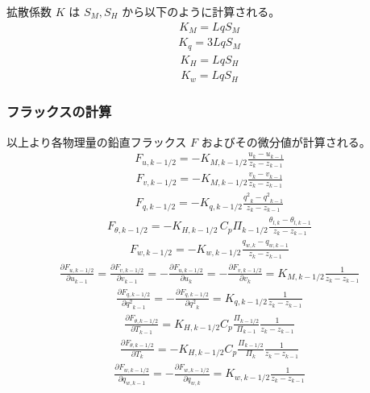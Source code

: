拡散係数 \(K\) は \(S_M,S_H\) から以下のように計算される。 \begin{eqnarray}K_M=LqS_M\end{eqnarray}
\begin{eqnarray}K_q=3LqS_M\end{eqnarray} \begin{eqnarray}K_H=LqS_H\end{eqnarray} \begin{eqnarray}K_w=LqS_H\end{eqnarray}

\hypertarget{ux30d5ux30e9ux30c3ux30afux30b9ux306eux8a08ux7b97}{%
\subsubsection{フラックスの計算}\label{ux30d5ux30e9ux30c3ux30afux30b9ux306eux8a08ux7b97}}

以上より各物理量の鉛直フラックス \(F\) およびその微分値が計算される。
\begin{eqnarray}F_{u,k-1/2}=-K_{M,k-1/2}\frac{u_{k}-u_{k-1}}{z_k-z_{k-1}}\end{eqnarray}
\begin{eqnarray}F_{v,k-1/2}=-K_{M,k-1/2}\frac{v_{k}-v_{k-1}}{z_k-z_{k-1}}\end{eqnarray}
\begin{eqnarray}F_{q,k-1/2}=-K_{q,k-1/2}\frac{{q^2}_ {k}-{q^2}_ {k-1}}{z_k-z_{k-1}}\end{eqnarray}
\begin{eqnarray}F_{\theta,k-1/2}=-K_{H,k-1/2}\,C_p\Pi_{k-1/2}\frac{\theta_{l,k}-\theta_{l,k-1}}{z_k-z_{k-1}}\end{eqnarray}
\begin{eqnarray}F_{w,k-1/2}=-K_{w,k-1/2}\frac{q_{w,k}-q_{w,k-1}}{z_k-z_{k-1}}\end{eqnarray}
\begin{eqnarray}\frac{\partial F_{u,k-1/2}}{\partial u_{k-1}}=\frac{\partial F_{v,k-1/2}}{\partial v_{k-1}}=-\frac{\partial F_{u,k-1/2}}{\partial u_{k}}=-\frac{\partial F_{v,k-1/2}}{\partial v_{k}}=K_{M,k-1/2}\frac{1}{z_k-z_{k-1}}\end{eqnarray}
\begin{eqnarray}\frac{\partial F_{q,k-1/2}}{\partial {q^2}_ {k-1}}=-\frac{\partial F_{q,k-1/2}}{\partial {q^2}_ {k}}=K_{q,k-1/2}\frac{1}{z_k-z_{k-1}}\end{eqnarray}
\begin{eqnarray}\frac{\partial F_{\theta,k-1/2}}{\partial T_{k-1}}=K_{H,k-1/2}C_p\frac{\Pi_{k-1/2}}{\Pi_{k-1}}\frac{1}{z_k-z_{k-1}}\end{eqnarray}
\begin{eqnarray}\frac{\partial F_{\theta,k-1/2}}{\partial T_{k}}=-K_{H,k-1/2}C_p\frac{\Pi_{k-1/2}}{\Pi_{k}}\frac{1}{z_k-z_{k-1}}\end{eqnarray}
\begin{eqnarray}\frac{\partial F_{w,k-1/2}}{\partial q_{w,k-1}}=-\frac{\partial F_{w,k-1/2}}{\partial q_{w,k}}=K_{w,k-1/2}\frac{1}{z_k-z_{k-1}}\end{eqnarray}

